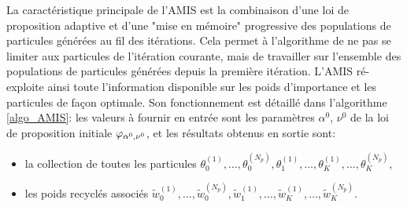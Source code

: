 La caractéristique principale de l'AMIS est la combinaison d'une loi de proposition adaptive et d'une "mise en mémoire" progressive des populations de particules générées au fil des itérations. Cela permet à l'algorithme de ne pas se limiter aux particules de l'itération courante, mais de travailler sur l'ensemble des populations de particules générées depuis la première itération. L'AMIS ré-exploite ainsi toute l'information disponible sur les poids d'importance et les particules de façon optimale. Son fonctionnement est détaillé dans l'algorithme \ref{algo_AMIS}: les valeurs à fournir en entrée sont  les paramètres $\alpha^0$, $\nu^0$ de la loi de proposition initiale ${\varphi}_{\alpha^0, \nu^0}$, et les résultats obtenus en sortie sont:

\begin{itemize}
	 \item la collection de toutes les particules $\theta_0^{(1)}, \dots, \theta_0^{(N_p)}, \theta_1^{(1)}, \dots, \theta_K^{(1)}, \dots, \theta_K^{(N_p)}$,
	 \item les poids recyclés associés $\tilde{w}_0^{(1)}, \dots, \tilde{w}_0^{(N_p)}, \tilde{w}_1^{(1)}, \dots, \tilde{w}_K^{(1)}, \dots, \tilde{w}_K^{(N_p)}$.\\
 \end{itemize}

